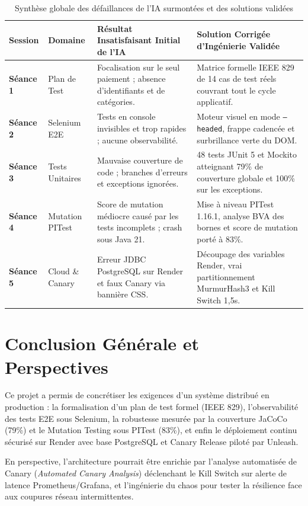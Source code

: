 \documentclass[11pt, a4paper, openany]{report}
\begin{document}
\begin{table}[h]
\centering
\renewcommand{\arraystretch}{1.2}
\small
\begin{tabularx}{\textwidth}{|l|l|X|X|}
\hline
\rowcolor{primary!20}
\textbf{Session} & \textbf{Domaine} & \textbf{Résultat Insatisfaisant Initial de l'IA} & \textbf{Solution Corrigée d'Ingénierie Validée} \\ \hline
\textbf{Séance 1} & Plan de Test & Focalisation sur le seul paiement ; absence d'identifiants et de catégories. & Matrice formelle IEEE 829 de 14 cas de test réels couvrant tout le cycle applicatif. \\ \hline
\textbf{Séance 2} & Selenium E2E & Tests en console invisibles et trop rapides ; aucune observabilité. & Moteur visuel en mode \texttt{--headed}, frappe cadencée et surbrillance verte du DOM. \\ \hline
\textbf{Séance 3} & Tests Unitaires & Mauvaise couverture de code ; branches d'erreurs et exceptions ignorées. & 48 tests JUnit 5 et Mockito atteignant 79\% de couverture globale et 100\% sur les exceptions. \\ \hline
\textbf{Séance 4} & Mutation PITest & Score de mutation médiocre causé par les tests incomplets ; crash sous Java 21. & Mise à niveau PITest 1.16.1, analyse BVA des bornes et score de mutation porté à 83\%. \\ \hline
\textbf{Séance 5} & Cloud \& Canary & Erreur JDBC PostgreSQL sur Render et faux Canary via bannière CSS. & Découpage des variables Render, vrai partitionnement MurmurHash3 et Kill Switch 1,5s. \\ \hline
\end{tabularx}
\caption{Synthèse globale des défaillances de l'IA surmontées et des solutions validées}
\end{table}

\section{Conclusion Générale et Perspectives}
Ce projet a permis de concrétiser les exigences d'un système distribué en production : la formalisation d'un plan de test formel (IEEE 829), l'observabilité des tests E2E sous Selenium, la robustesse mesurée par la couverture JaCoCo (79\%) et le Mutation Testing sous PITest (83\%), et enfin le déploiement continu sécurisé sur Render avec base PostgreSQL et Canary Release piloté par Unleash.

En perspective, l'architecture pourrait être enrichie par l'analyse automatisée de Canary (\textit{Automated Canary Analysis}) déclenchant le Kill Switch sur alerte de latence Prometheus/Grafana, et l'ingénierie du chaos pour tester la résilience face aux coupures réseau intermittentes.
\end{document}
